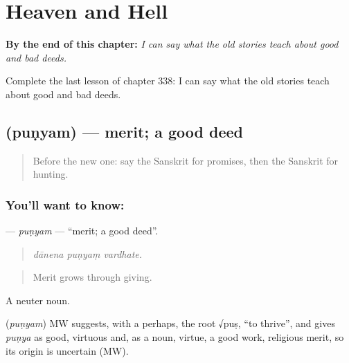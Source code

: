 
\chapter{Heaven and Hell}
\label{ch:sa-heaven-and-hell}

\begin{chapteropening}
\textbf{By the end of this chapter:} \emph{I can say what the old stories teach about good and bad deeds.}

Complete the last lesson of chapter 338: I can say what the old stories teach about good and bad deeds.
\end{chapteropening}

\section[\texorpdfstring{\sk{पुण्यम्} (puṇyam)}{पुण्यम् (puṇyam)}]{ (puṇyam) — merit; a good deed}

\label{lesson:SA-C338-punyam}



\begin{quote}
Before the new one: say the Sanskrit for promises, then the Sanskrit for hunting.
\end{quote}

\subsection*{You'll want to know: }
\textbf{} — \emph{puṇyam} — \textquotedblleft{}merit; a good deed\textquotedblright{}.

\begin{quote}
  
\end{quote}

\begin{quote}
\emph{dānena puṇyaṃ vardhate.}
\end{quote}

\begin{quote}
Merit grows through giving.
\end{quote}

A neuter noun.

\begin{cousinweb}
\textbf{} (\emph{puṇyam}) MW suggests, with a perhaps, the root √puṣ, \textquotedblleft{}to thrive\textquotedblright{}, and gives \emph{puṇya} as good, virtuous and, as a noun, virtue, a good work, religious merit, so its origin is uncertain (MW).
\end{cousinweb}

